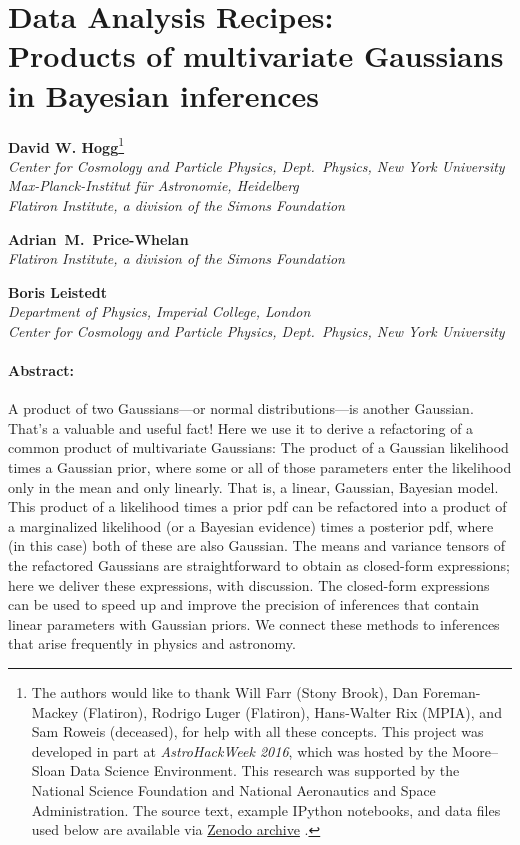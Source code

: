 \section*{Data Analysis Recipes:\\
  Products of multivariate Gaussians\\
  in Bayesian inferences}

\noindent\textbf{David W. Hogg}\footnote{%
  The authors would like to thank
  Will Farr (Stony Brook),
  Dan Foreman-Mackey (Flatiron),
  Rodrigo Luger (Flatiron),
  Hans-Walter Rix (MPIA),
  and
  Sam Roweis (deceased),
  for help with all these concepts.
  This project was developed
  in part at \textsl{AstroHackWeek 2016}, which was
  hosted by the Moore--Sloan Data Science Environment.
  This research was supported by the National Science Foundation and National Aeronautics and Space Administration.
  The source text, example IPython notebooks, and data files used below are
  available via \href{https://doi.org/10.5281/zenodo.3855689}{Zenodo archive}
  \citep{zenodo}.

}\\
{\footnotesize%
  \textsl{Center for Cosmology and Particle Physics, Dept.\ Physics, New York University}\\
  \textsl{Max-Planck-Institut f\"ur Astronomie, Heidelberg}\\
  \textsl{Flatiron Institute, a division of the Simons Foundation}%
}

\medskip\noindent\textbf{Adrian~M.~Price-Whelan}\\
{\footnotesize%
  \textsl{Flatiron Institute, a division of the Simons Foundation}%
}

\medskip\noindent\textbf{Boris Leistedt}\\
{\footnotesize%
  \textsl{Department of Physics, Imperial College, London}\\
  \textsl{Center for Cosmology and Particle Physics, Dept.\ Physics, New York University}%
}

\paragraph{Abstract:}
A product of two Gaussians---or normal distributions---is another Gaussian.
That's a valuable and useful fact!
Here we use it to derive a refactoring of a common product of
multivariate Gaussians:
The product of a Gaussian likelihood times a Gaussian prior, where some or all
of those parameters enter the likelihood only in the mean and only linearly.
That is, a linear, Gaussian, Bayesian model.
This product of a likelihood times a prior pdf can be refactored into a product of a
marginalized likelihood (or a Bayesian evidence) times a posterior pdf, where
(in this case) both of these are also Gaussian.
The means and variance tensors of the refactored Gaussians are straightforward
to obtain as closed-form expressions;
here we deliver these expressions, with discussion.
The closed-form expressions can be used to speed up and improve the precision
of inferences that contain linear parameters with Gaussian priors.
We connect these methods to inferences that arise frequently in physics
and astronomy.

